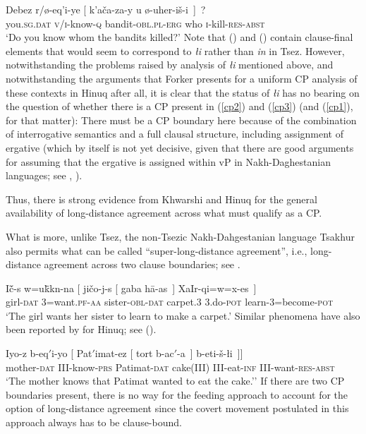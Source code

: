 \documentclass[output=paper
,modfonts
,nonflat]{langsci/langscibook}
\begin{document}
	\ea\label{ex:mueller:20} \label{cp3}
	\gll Debez r/\o -eq'i-ye [ k'a\v{c}a\textgamma -za-y \textbeltl u \o -uher-i\v{s}-\textbeltl i~]~? \\
	you.{\scshape sg.dat} {\scshape v/i}-know-{\scshape q} {} bandit-{\scshape obl.pl-erg}   who {\scshape i}-kill-{\scshape res-abst} \\ 
	\glt `Do you know whom the bandits killed?'
	\z
	Note that (\LLast) and (\Last) contain clause-final elements that
	would seem to correspond to {\itshape {\l}i} rather than  {\it
		\textcrlambda in} in Tsez. However, notwithstanding the problems
	raised by  analysis of {\itshape {\l}i}
	mentioned above, and notwithstanding the arguments that Forker
	presents for a uniform CP analysis of these contexts in Hinuq after
	all, it is clear that the status of {\itshape {\l}i} has no bearing on the
	question of whether there is a CP present in (\ref{cp2}) and (\ref{cp3})
	(and (\ref{cp1}), for that matter): There must be a CP boundary here
	because of the combination of interrogative semantics and a full
	clausal structure, including assignment of ergative (which by itself
	is not yet decisive, given that there are good arguments for assuming
	that the ergative is assigned within vP in Nakh-Daghestanian
	languages; see \citealt{Gagliardietal:14}, \citealt{Polinsky:16:arc}). 
	
	Thus, there is strong evidence from Khwarshi and Hinuq for the general
	availability of long-distance agreement across what must qualify as a
	CP.
	
	What is more, unlike Tsez, the non-Tsezic Nakh-Dahgestanian language
	Tsakhur  also permits what can be called
	``super-long-distance agreement'', i.e., long-distance agreement 
	across two clause boundaries; see \citet{Kibrik:99}.
	
	\ea\label{ex:mueller:21} \label{tsa1}
	\gll I\v{c}\={\textsci}-s w=u\={k}\={\textsci}k\textbari n-na [ ji\v{c}o-j-s [ gaba  h\={a}\textglotstop-as~] XaIr-qi=w=x-es~] \\
	girl-\textsc{dat} {3}=want.\textsc{pf-{aa}} {} sister-\textsc{obl-dat} {} {carpet.3} 3.do-\textsc{pot} learn-{3}=become-\textsc{pot} \\
	\glt `The girl wants her sister to learn to make a carpet.'
	\z
	Similar phenomena have also been reported by \citet{Forker:11} for
	Hinuq; see (\Next).
	
	\ea \label{ex:mueller:22}\label{tsa2}
	\gll Iyo-z b-eq$'$i-yo [ Pat$'$imat-ez [ tort  b-ac$'$-a~] b-eti-\v{s}-\l i~]]\\
	mother-{\scshape dat} III-know-{\scshape prs} {} Patimat-{\scshape dat} {} cake(III) III-eat-{\scshape inf} III-want-{\scshape res}-{\scshape abst}\\
	\glt `The mother knows that Patimat wanted to eat the cake.''
	\z
	If there are two CP boundaries present, there is no way for the feeding approach
	to account for the option of long-distance agreement since the covert
	movement postulated in this approach always has to be
	clause-bound.
	
\end{document}
